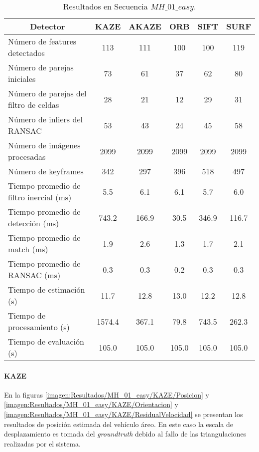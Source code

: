 \begin{table}[H]
	\caption{Resultados en Secuencia $MH\_ 01\_ easy$.}
	\begin{tabular}{|l|c|c|c|c|c|}
		\hline
		\multicolumn{1}{|c|}{\textbf{Detector}} & \textbf{KAZE} & \textbf{AKAZE} & \textbf{ORB} & \textbf{SIFT} & \textbf{SURF} \\ \hline
		Número de features detectados & 113 & 111 & 100 & 100 & 119 \\ \hline
		Número de parejas iniciales & 73 & 61 & 37 & 62 & 80 \\ \hline
		Número de parejas del filtro de celdas & 28 & 21 & 12 & 29 & 31 \\ \hline
		Número de inliers del RANSAC & 53 & 43 & 24 & 45 & 58 \\ \hline
		Número de imágenes procesadas & 2099 & 2099 & 2099 & 2099 & 2099 \\ \hline
		Número de keyframes & 342 & 297 & 396 & 518 & 497 \\ \hline
		Tiempo promedio de filtro inercial (ms) & 5.5 & 6.1 & 6.1 & 5.7 & 6.0 \\ \hline
		Tiempo promedio de detección  (ms) & 743.2 & 166.9 & 30.5 & 346.9 & 116.7 \\ \hline
		Tiempo promedio de match (ms) & 1.9 & 2.6 & 1.3 & 1.7 & 2.1 \\ \hline
		Tiempo promedio de RANSAC (ms) & 0.3 & 0.3 & 0.2 & 0.3 & 0.3 \\ \hline
		Tiempo de estimación (s) & 11.7 & 12.8 & 13.0 & 12.2 & 12.8 \\ \hline
		Tiempo de  procesamiento (s) & 1574.4 & 367.1 & 79.8 & 743.5 & 262.3 \\ \hline
		Tiempo de evaluación (s) & 105.0 & 105.0 & 105.0 & 105.0 & 105.0 \\ \hline
	\end{tabular}
	\label{Tabla/Resultados/MH_01_easy}
\end{table}



\paragraph {KAZE}


En la figuras \ref{imagen:Resultados/MH_01_easy/KAZE/Posicion} y \ref{imagen:Resultados/MH_01_easy/KAZE/Orientacion} y \ref{imagen:Resultados/MH_01_easy/KAZE/ResidualVelocidad} se presentan los resultados de posición estimada del vehículo áreo. En este caso la escala de desplazamiento es tomada del \textit{groundtruth} debido al fallo de las triangulaciones realizadas por el sistema.
 
